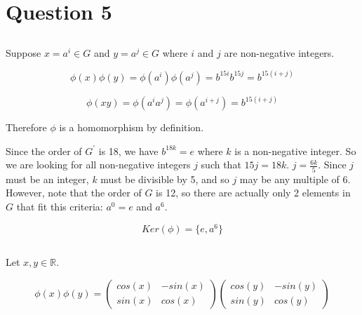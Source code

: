 \documentclass[a4paper,12pt]{article}
\numberwithin{equation}{section}
\begin{document}
\section{Question 5}

\subsection{}

Suppose $x = a^i \in G$ and $y = a^j \in G$ where $i$ and $j$ are non-negative integers.

\begin{equation}
\phi (x) \phi(y) = \phi(a^i)\phi(a^j) = b^{15i}b^{15j} = b^{15(i + j)}
\end{equation}

\begin{equation}
\phi(xy) = \phi(a^ia^j) = \phi(a^{i + j}) = b^{15(i + j)}
\end{equation}

Therefore $\phi$ is a homomorphism by definition.

Since the order of $G^{\prime}$ is 18, we have $b^{18k} = e$ where $k$ is a non-negative integer. So we are looking for all non-negative integers $j$ such that $15j = 18k$. $j = \frac{6k}{5}$. Since $j$ must be an integer, $k$ must be divisible by 5, and so $j$ may be any multiple of 6. However, note that the order of $G$ is 12, so there are actually only 2 elements in $G$ that fit this criteria: $a^0 = e$ and $a ^ 6$.

\begin{equation}
Ker(\phi) = \{e, a^6\}
\end{equation}

\subsection{}

Let $x, y \in \mathbb{R}$.

\begin{equation*}
\phi(x)\phi(y) = 
\left( 
	\begin{array}{cc}
	cos(x) & -sin(x) \\
	sin(x) & cos(x) 
	\end{array} 
\right)
\left( 
	\begin{array}{cc}
	cos(y) & -sin(y) \\
	sin(y) & cos(y) 
	\end{array} 
\right)
\end{equation*}
\end{document}
